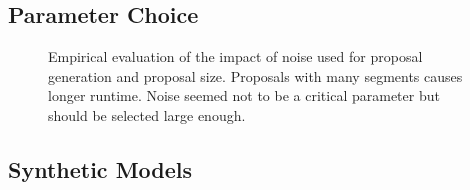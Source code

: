 \documentclass[10pt,twocolumn,letterpaper]{article}
\begin{document}
\subsection{Parameter Choice}
\begin{figure}
\centering
{}
\caption{Empirical evaluation of the impact of noise used for proposal generation and proposal size.
  Proposals with many segments causes longer runtime. Noise seemed not to be a critical parameter but should be selected large enough.
}
\end{figure}

\subsection{Synthetic Models}
\end{document}
